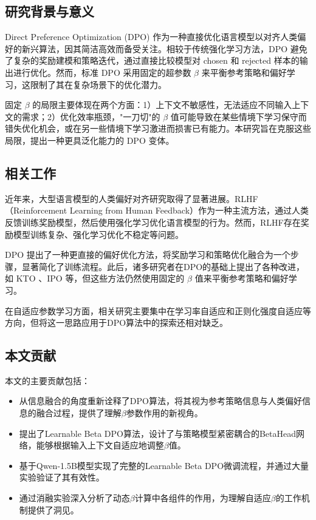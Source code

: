 \subsection{研究背景与意义}
Direct Preference Optimization (DPO) \cite{rafailov2023direct} 作为一种直接优化语言模型以对齐人类偏好的新兴算法，因其简洁高效而备受关注。相较于传统强化学习方法，DPO 避免了复杂的奖励建模和策略迭代，通过直接比较模型对 chosen 和 rejected 样本的输出进行优化。然而，标准 DPO 采用固定的超参数 $\beta$ 来平衡参考策略和偏好学习，这限制了其在复杂场景下的优化潜力。

固定 $\beta$ 的局限主要体现在两个方面：1）上下文不敏感性，无法适应不同输入上下文的需求；2）优化效率瓶颈，"一刀切"的 $\beta$ 值可能导致在某些情境下学习保守而错失优化机会，或在另一些情境下学习激进而损害已有能力。本研究旨在克服这些局限，提出一种更具泛化能力的 DPO 变体。

\subsection{相关工作}
近年来，大型语言模型的人类偏好对齐研究取得了显著进展。RLHF（Reinforcement Learning from Human Feedback）\cite{ouyang2022training, christiano2017deep}作为一种主流方法，通过人类反馈训练奖励模型，然后使用强化学习优化语言模型的行为。然而，RLHF存在奖励模型训练复杂、强化学习优化不稳定等问题。

DPO \cite{rafailov2023direct} 提出了一种更直接的偏好优化方法，将奖励学习和策略优化融合为一个步骤，显著简化了训练流程。此后，诸多研究者在DPO的基础上提出了各种改进，如 KTO \cite{kassner2023kto}、IPO \cite{azar2023general}等，但这些方法仍然使用固定的 $\beta$ 值来平衡参考策略和偏好学习。

在自适应参数学习方面，相关研究主要集中在学习率自适应\cite{zou2021sufficient, smith2017cyclical}和正则化强度自适应\cite{pan2020adaptive}等方向，但将这一思路应用于DPO算法中的探索还相对缺乏。

\subsection{本文贡献}
本文的主要贡献包括：

\begin{itemize}
    \item 从信息融合的角度重新诠释了DPO算法，将其视为参考策略信息与人类偏好信息的融合过程，提供了理解$\beta$参数作用的新视角。
    \item 提出了Learnable Beta DPO算法，设计了与策略模型紧密耦合的BetaHead网络，能够根据输入上下文自适应地调整$\beta$值。
    \item 基于Qwen-1.5B模型实现了完整的Learnable Beta DPO微调流程，并通过大量实验验证了其有效性。
    \item 通过消融实验深入分析了动态$\beta$计算中各组件的作用，为理解自适应$\beta$的工作机制提供了洞见。
\end{itemize} 